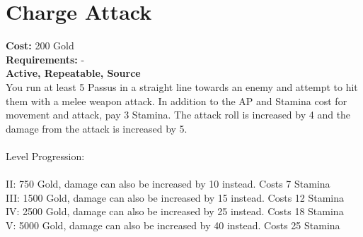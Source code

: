 \section{Charge Attack}
\textbf{Cost:} 200 Gold\\
\textbf{Requirements:} -\\
\textbf{Active, Repeatable, Source}\\
You run at least 5 Passus in a straight line towards an enemy and attempt to hit them with a melee weapon attack. In addition to the AP and Stamina cost for movement and attack, pay 3 Stamina. The attack roll is increased by 4 and the damage from the attack is increased by 5.\\
\\
Level Progression:\\
\\
II: 750 Gold, damage can also be increased by 10 instead. Costs 7 Stamina\\
III: 1500 Gold, damage can also be increased by 15 instead. Costs 12 Stamina\\
IV: 2500 Gold, damage can also be increased by 25 instead. Costs 18 Stamina\\
V: 5000 Gold, damage can also be increased by 40 instead. Costs 25 Stamina\\